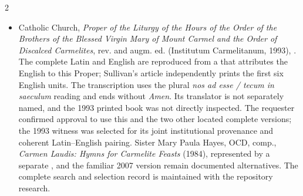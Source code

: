 \begin{multicols}{2}
\begin{itemize}
\item Catholic Church, \textit{Proper of the Liturgy of the Hours of the Order of the Brothers of the Blessed Virgin Mary of Mount Carmel and the Order of Discalced Carmelites}, rev. and augm. ed. (Institutum Carmelitanum, 1993), . The complete Latin and English are reproduced from a  that attributes the English to this Proper; Sullivan's article independently prints the first six English units. The transcription uses the plural \textit{nos ad esse / tecum in saeculum} reading and ends without \textit{Amen}. Its translator is not separately named, and the 1993 printed book was not directly inspected. The requester confirmed approval to use this and the two other located complete versions; the 1993 witness was selected for its joint institutional provenance and coherent Latin--English pairing. Sister Mary Paula Hayes, OCD, comp., \textit{Carmen Laudis: Hymns for Carmelite Feasts} (1984), represented by a separate , and the familiar 2007 version remain documented alternatives. The complete search and selection record is maintained with the repository research.
\end{itemize}

\end{multicols}
